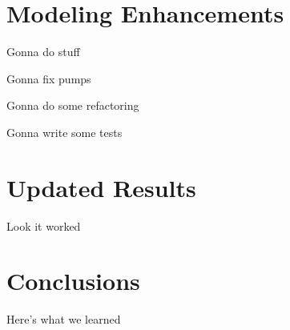 \documentclass{report}
\begin{document}
  \chapter{Modeling Enhancements}\label{ch:enhancements}

    Gonna do stuff

    Gonna fix pumps

    Gonna do some refactoring

    Gonna write some tests

  \chapter{Updated Results}\label{ch:newresults}

    Look it worked

  \chapter{Conclusions}\label{ch:conclusions}

    Here's what we learned
\end{document}
